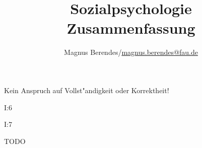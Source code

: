 \documentclass[a4paper, 12pt]{scrartcl}
\begin{document}
\title{Sozialpsychologie Zusammenfassung}
\author{Magnus Berendes/\href{mailto:magnus.berendes@fau.de}{magnus.berendes@fau.de}}
\maketitle

{ Kein Anspruch auf Vollst"andigkeit oder Korrektheit!}

\tableofcontents










	I:6

	I:7

	TODO
\end{document}

